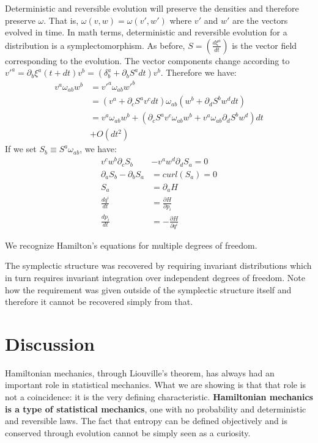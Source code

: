 \documentclass[11pt]{article}
\begin{document}
Deterministic and reversible evolution will preserve the densities and therefore preserve $\omega$. That is, $\omega(v, w) = \omega(v',w')$ where $v'$ and $w'$ are the vectors evolved in time. In math terms, deterministic and reversible evolution for a distribution is a symplectomorphism. As before, $S = \left(\frac{d\xi^a}{dt}\right)$ is the vector field corresponding to the evolution. The vector components change according to $v'^a = \partial_b \xi^a(t+dt) v^b = (\delta^a_b + \partial_b S^a dt) v^b$. Therefore we have:
\begin{align*}
v^{a} \omega_{ab} w^{b} &= v'^{a} \omega_{ab} w'^{b}  \\
&= (v^{a} + \partial_{c} S^{a} v^{c} dt) \omega_{ab} ( w^{b} + \partial_{d} S^{b} w^{d} dt) \\
&= v^{a} \omega_{ab} w^{b} + (\partial_{c} S^{a} v^{c} \omega_{ab} w^{b} + v^{a} \omega_{ab} \partial_{d} S^{b} w^{d}) dt \\ &+ O(dt^2)
\end{align*}
If we set $S_{b} \equiv S^{a} \omega_{ab}$, we have:
\begin{equation}
\begin{aligned}
v^{c} w^{b} \partial_{c} S_{b} &- v^{a} w^{d} \partial_{d} S_{a} = 0\\
\partial_{a} S_{b} - \partial_{b} S_{a} &= curl(S_{a}) = 0 \\
S_{a} &= \partial_{a}H \\
\frac{dq^i}{dt} &= \frac{\partial H}{\partial p_i}  \\
\frac{dp_i}{dt} &= - \frac{\partial H}{\partial q^i}
\end{aligned}
\end{equation}

We recognize Hamilton's equations for multiple degrees of freedom.

The symplectic structure was recovered by requiring invariant distributions which in turn requires invariant integration over independent degrees of freedom. Note how the requirement was given outside of the symplectic structure itself and therefore it cannot be recovered simply from that.

\section{Discussion}

Hamiltonian mechanics, through Liouville's theorem, has always had an important role in statistical mechanics. What we are showing is that that role is not a coincidence: it is the very defining characteristic. \textbf{Hamiltonian mechanics is a type of statistical mechanics}, one with no probability and deterministic and reversible laws. The fact that entropy can be defined objectively and is conserved through evolution cannot be simply seen as a curiosity.
\end{document}

